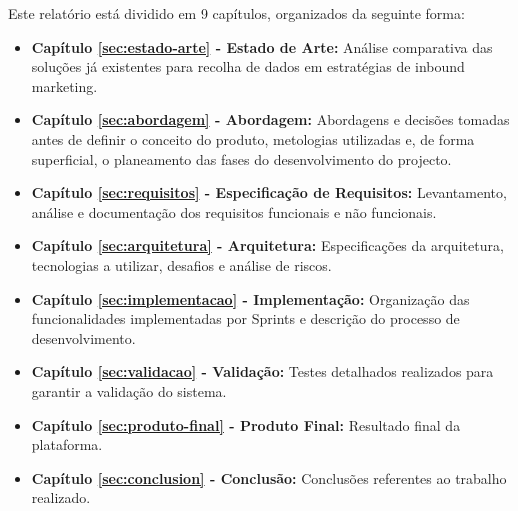 Este relatório está dividido em 9 capítulos, organizados da seguinte forma:
\begin{itemize}
	 \item \textbf{Capítulo \ref{sec:estado-arte} - Estado de Arte: }Análise comparativa das soluções já existentes para recolha de dados em estratégias de inbound marketing.
	
	\item \textbf{Capítulo \ref{sec:abordagem} - Abordagem: }Abordagens e decisões tomadas antes de definir o conceito do produto, metologias utilizadas e, de forma superficial, o planeamento das fases do desenvolvimento do projecto.
	
	\item \textbf{Capítulo \ref{sec:requisitos} - Especificação de Requisitos: }Levantamento, análise e documentação dos requisitos funcionais e não funcionais.
	
	\item \textbf{Capítulo \ref{sec:arquitetura} - Arquitetura: }Especificações da arquitetura, tecnologias a utilizar, desafios e análise de riscos.
	
	\item \textbf{Capítulo \ref{sec:implementacao} - Implementação: }Organização das funcionalidades implementadas por Sprints e descrição do processo de desenvolvimento.
	
	\item \textbf{Capítulo \ref{sec:validacao} - Validação: }Testes detalhados realizados para garantir a validação do sistema.
	
	\item \textbf{Capítulo \ref{sec:produto-final} - Produto Final: }Resultado final da plataforma.

	\item \textbf{Capítulo \ref{sec:conclusion} - Conclusão: }Conclusões referentes ao trabalho realizado.
	
\end{itemize}



\blankpage

\glsresetall



